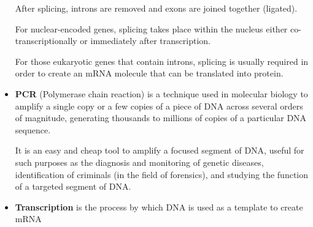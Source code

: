 \begin{itemize}
After splicing, introns are removed and exons are joined together (ligated).

For nuclear-encoded genes, splicing takes place within the nucleus either
co-transcriptionally or immediately after transcription.

For those eukaryotic genes that contain introns, splicing is usually required
in order to create an mRNA molecule that can be translated into protein.
  \item \textbf{PCR} (Polymerase chain reaction) is a technique used in
molecular biology to amplify a single copy or a few copies of a piece of DNA
across several orders of magnitude, generating thousands to millions of copies
of a particular DNA sequence.

It is an easy and cheap tool to amplify a focused segment of DNA, useful for
such purposes as the diagnosis and monitoring of genetic diseases,
identification of criminals (in the field of forensics), and studying the
function of a targeted segment of DNA.
  \item \textbf{Transcription} is the process by which DNA is used as a
template to create mRNA
\end{itemize}
